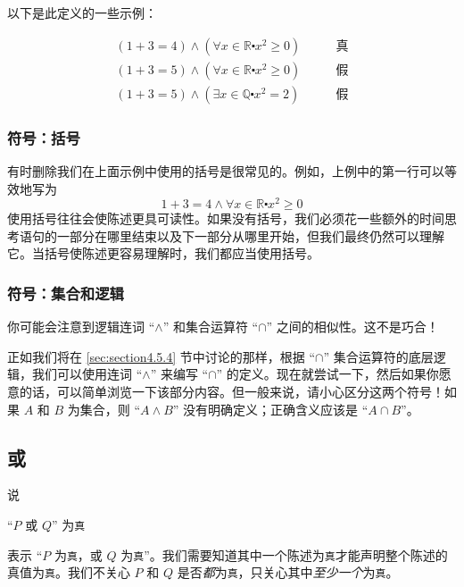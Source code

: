 以下是此定义的一些示例：\\

\begin{example}
    \begin{align*}
        (1 + 3 = 4) \land (\forall x \in \mathbb{R} \centerdot x^2 \ge 0) \qquad &\text{真} \\
        (1 + 3 = 5) \land (\forall x \in \mathbb{R} \centerdot x^2 \ge 0) \qquad &\text{假} \\
        (1 + 3 = 5) \land (\exists x \in \mathbb{Q} \centerdot x^2 = 2)   \qquad &\text{假}
    \end{align*}
\end{example}

\subsubsection*{符号：括号}

有时删除我们在上面示例中使用的括号是很常见的。例如，上例中的第一行可以等效地写为
\[1 + 3 = 4 \land \forall x \in \mathbb{R} \centerdot x^2 \ge 0\]
使用括号往往会使陈述更具可读性。如果没有括号，我们必须花一些额外的时间思考语句的一部分在哪里结束以及下一部分从哪里开始，但我们最终仍然可以理解它。当括号使陈述更容易理解时，我们都应当使用括号。

\subsubsection*{符号：集合和逻辑}

你可能会注意到逻辑连词 ``$\land$'' 和集合运算符 ``$\cap$'' 之间的相似性。这不是巧合！

正如我们将在 \ref{sec:section4.5.4} 节中讨论的那样，根据 ``$\cap$'' 集合运算符的底层逻辑，我们可以使用连词 ``$\land$'' 来编写 ``$\cap$'' 的定义。现在就尝试一下，然后如果你愿意的话，可以简单浏览一下该部分内容。但一般来说，请小心区分这两个符号！如果 $A$ 和 $B$ 为集合，则 ``$A \land B$'' 没有明确定义；正确含义应该是 ``$A \cap B$''。

\subsection{或}

说
\begin{center}
    ``$P$ 或 $Q$'' 为\verb|真|
\end{center}

表示 ``$P$ 为\verb|真|，或 $Q$ 为\verb|真|''。我们需要知道其中一个陈述为\verb|真|才能声明整个陈述的真值为\verb|真|。我们不关心 $P$ 和 $Q$ 是否\emph{都}为\verb|真|，只关心其中\emph{至少一个}为\verb|真|。


